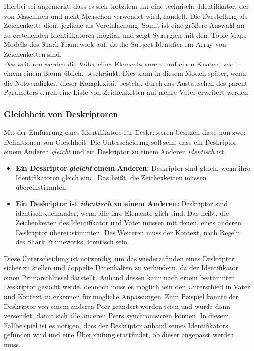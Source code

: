 \documentclass[a4paper]{article}
\begin{document}
	Hierbei sei angemerkt, dass es sich trotzdem um eine technische Identifikator,
	der von Maschinen und nicht Menschen verwendet wird, handelt. Die Darstellung
	als Zeichenkette dient jegliche als Vereinfachung. Somit ist eine größere
	Auswahl an zu erstellenden Identifikatoren möglich und zeigt Synergien 
	mit dem Topic Maps Modells des Shark Framework auf, da die Subject Identifier
	ein Array von Zeichenketten sind. \\
	
	Des weiteren werden die Väter eines Elements vorerst auf einen Knoten,
	wie in einem einem Baum üblich, beschränkt. Dies kann in diesem Modell später,
	wenn die Notwendigkeit dieser Komplexität besteht, durch das Austauschen des
	parent Parameters durch eine Liste von Zeichenketten auf mehre Väter erweitert
	werden.
	
	\subsubsection{Gleichheit von Deskriptoren}
	
	Mit der Einführung eines Identifikators für Deskriptoren besitzen
	diese nun zwei Definitionen von Gleichheit. Die Unterscheidung soll sein,
	dass ein Deskriptor einem Anderen \emph{gleicht} und ein Deskriptor zu
	einem Anderen \emph{identisch} ist.
	
	\begin{itemize}
		\item \textbf{Ein Deskriptor \emph{gleicht} einem Anderen:} Deskriptor
		sind gleich, wenn ihre Identifikatoren gleich sind. Das heißt, die
		Zeichenketten müssen übereinstimmten.
		\item \textbf{Ein Deskriptor ist \emph{identisch} zu einem Anderen:}
		Deskriptor sind identisch zueinander, wenn alle ihre Elemente glich sind.
		Das heißt, die Zeichenketten des Identifikator und Vater müssen mit denen,
		eines anderen Deskriptor übereinstimmten. Des Weiteren muss der Kontext,
		nach Regeln des Shark Frameworks, identisch sein.
	\end{itemize} 	
	
	Diese Unterscheidung ist notwendig, um das wiederzufinden eines Deskriptor
	sicher zu stellen und doppelte Datenhalten zu verhindern, da der Identifikator
	einen Primärschlüssel darstellt. Anhand dessen kann nach einem bestimmten
	Deskriptor gesucht werde. dennoch muss es möglich sein den Unterschied in
	Vater und Kontext zu erkennen für mögliche Anpassungen. Zum Beispiel könnte
	der Deskriptor von einem anderen Peer geändert worden seien und wurde dann
	versendet, damit sich alle anderen Peers synchronisieren können. In diesem
	Fallbeispiel ist es nötigen, dass der Deskriptor anhand seines Identifikators
	gefunden wird und eine Überprüfung stattfindet, ob dieser angepasst werden
	muss. \\
	
\end{document}
